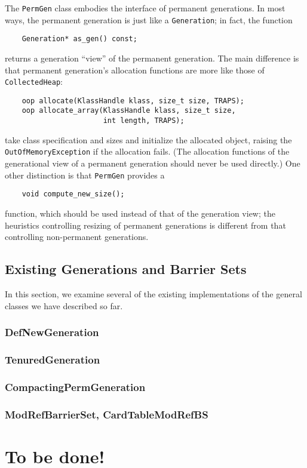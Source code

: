 \documentclass{article}
\begin{document}
The {\tt PermGen} class embodies the interface of permanent
generations.  In most ways, the permanent generation is just like a
{\tt Generation}; in fact, the function
\begin{verbatim}
    Generation* as_gen() const;
\end{verbatim}
returns a generation ``view'' of the permanent generation.  The main
difference is that permanent generation's allocation functions are
more like those of {\tt CollectedHeap}:
\begin{verbatim}
    oop allocate(KlassHandle klass, size_t size, TRAPS);
    oop allocate_array(KlassHandle klass, size_t size,
                       int length, TRAPS);
\end{verbatim}
take class specification and sizes and initialize the allocated
object, raising the {\tt OutOfMemoryException} if the allocation
fails.  (The allocation functions of the generational view of a
permanent generation should never be used directly.)
One other distinction is that {\tt PermGen} provides a
\begin{verbatim}
    void compute_new_size();
\end{verbatim}
function, which should be used instead of that of the generation view;
the heuristics controlling resizing of permanent generations is
different from that controlling non-permanent generations.

\subsection{Existing Generations and Barrier Sets}
\label{gen:existing}

In this section, we examine several of the existing implementations of
the general classes we have described so far.

\subsubsection{DefNewGeneration}
\subsubsection{TenuredGeneration}
\subsubsection{CompactingPermGeneration}
\subsubsection{ModRefBarrierSet, CardTableModRefBS}

\section{To be done!}
\end{document}
